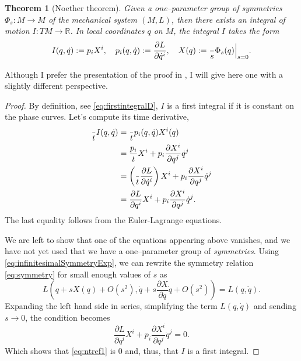 \documentclass[english,fontsize=11pt,paper=a5,oneside]{scrbook}
\newcommand{\R}{\mathbb{R}}
\let\d\relax
\newcommand{\d}{\mathrm{d}}
\newtheorem{theorem}{Theorem}[chapter]
\theoremstyle{definition}
\begin{document}
\begin{theorem}[Noether theorem]\label{thm:noether}
  Given a one--parameter group of symmetries $\Phi_s: M \to M$ of the mechanical system $(M,L)$, then there exists an integral of motion $I: TM \to \R$.
  In local coordinates $q$ on $M$, the integral $I$ takes the form
  \begin{equation}
    I(q,\dot q) := p_i X^i,
    \quad p_i(q, \dot q) := \frac{\partial L}{\partial \dot q^i},
    \quad X(q) := \frac{\d}{\d s} \Phi_s(q) \Big|_{s=0}.
  \end{equation}
\end{theorem}

Although I prefer the presentation of the proof in \cite[Chapter 20.B]{book:arnold}, I will give here one with a slightly different perspective.
\begin{proof}
  By definition, see \eqref{eq:firstintegralD}, $I$ is a first integral if it is constant on the phase curves.
  Let's compute its time derivative,
  \begin{align}
    \frac{\d}{\d t} I(q, \dot q)
     & = \frac{\d}{\d t} p_i(q, \dot q) X^i(q)                                                                                 \\
     & = \frac{\d p_i}{\d t} X^i + p_i \frac{\partial X^i}{\partial q^j} \dot q^j                                              \\
     & = \left(\frac{\d}{\d t}\frac{\partial L}{\partial \dot q^i}\right) X^i + p_i \frac{\partial X^i}{\partial q^j} \dot q^j \\
     & = \frac{\partial L}{\partial q^i} X^i + p_i \frac{\partial X^i}{\partial q^j} \dot q^j. \label{eq:ntref1}
  \end{align}
  The last equality follows from the Euler-Lagrange equations.

  We are left to show that one of the equations appearing above vanishes, and we have not yet used that we have a one--parameter group of \emph{symmetries}.
  Using \eqref{eq:infinitesimalSymmetryExp}, we can rewrite the symmetry relation \eqref{eq:symmetry} for small enough values of $s$ as
  \begin{equation}\label{eq:invariance}
    L\left( q + s X(q) + O(s^2), \dot q + s \frac{\partial X}{\partial q} \dot q + O(s^2) \right) = L(q, \dot q).
  \end{equation}
  Expanding the left hand side in series, simplifying the term $L(q, \dot q)$ and sending $s\to 0$, the condition becomes
  \begin{equation}\label{eq:ntref2}
    \frac{\partial L}{\partial q^i} X^i + p_i \frac{\partial X^i}{\partial q^j} \dot q^j = 0.
  \end{equation}
  Which shows that \eqref{eq:ntref1} is $0$ and, thus, that $I$ is a first integral.
\end{proof}
\end{document}
